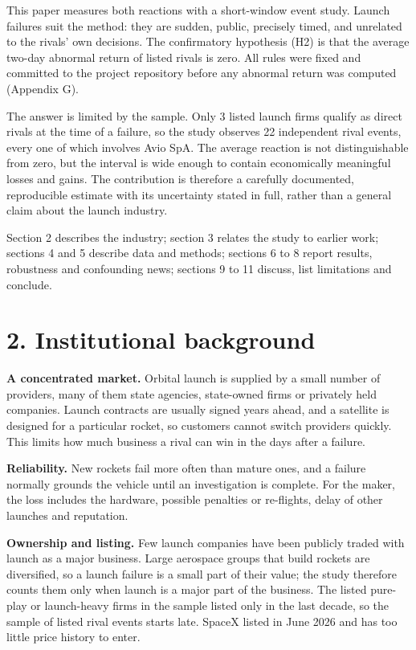 \documentclass[12pt,a4paper]{article}
\begin{document}
This paper measures both reactions with a short-window event study. Launch failures suit the method: they are sudden, public, precisely timed, and unrelated to the rivals' own decisions. The confirmatory hypothesis (H2) is that the average two-day abnormal return of listed rivals is zero. All rules were fixed and committed to the project repository before any abnormal return was computed (Appendix G).

The answer is limited by the sample. Only 3 listed launch firms qualify as direct rivals at the time of a failure, so the study observes 22 independent rival events, every one of which involves Avio SpA. The average reaction is not distinguishable from zero, but the interval is wide enough to contain economically meaningful losses and gains. The contribution is therefore a carefully documented, reproducible estimate with its uncertainty stated in full, rather than a general claim about the launch industry.

Section 2 describes the industry; section 3 relates the study to earlier work; sections 4 and 5 describe data and methods; sections 6 to 8 report results, robustness and confounding news; sections 9 to 11 discuss, list limitations and conclude.

\section*{2. Institutional background}
\textbf{A concentrated market.} Orbital launch is supplied by a small number of providers, many of them state agencies, state-owned firms or privately held companies. Launch contracts are usually signed years ahead, and a satellite is designed for a particular rocket, so customers cannot switch providers quickly. This limits how much business a rival can win in the days after a failure.

\textbf{Reliability.} New rockets fail more often than mature ones, and a failure normally grounds the vehicle until an investigation is complete. For the maker, the loss includes the hardware, possible penalties or re-flights, delay of other launches and reputation.

\textbf{Ownership and listing.} Few launch companies have been publicly traded with launch as a major business. Large aerospace groups that build rockets are diversified, so a launch failure is a small part of their value; the study therefore counts them only when launch is a major part of the business. The listed pure-play or launch-heavy firms in the sample listed only in the last decade, so the sample of listed rival events starts late. SpaceX listed in June 2026 and has too little price history to enter.
\end{document}
